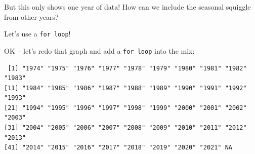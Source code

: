 \documentclass[
]{book}
\newenvironment{Shaded}{\begin{snugshade}}{\end{snugshade}}
\newcommand{\CommentTok}[1]{\textcolor[rgb]{0.56,0.35,0.01}{\textit{#1}}}
\newcommand{\DataTypeTok}[1]{\textcolor[rgb]{0.13,0.29,0.53}{#1}}
\newcommand{\DecValTok}[1]{\textcolor[rgb]{0.00,0.00,0.81}{#1}}
\newcommand{\KeywordTok}[1]{\textcolor[rgb]{0.13,0.29,0.53}{\textbf{#1}}}
\newcommand{\NormalTok}[1]{#1}
\newcommand{\OperatorTok}[1]{\textcolor[rgb]{0.81,0.36,0.00}{\textbf{#1}}}
\newcommand{\StringTok}[1]{\textcolor[rgb]{0.31,0.60,0.02}{#1}}
\begin{document}
But this only shows one year of data! How can we include the seasonal squiggle from other years?

Let's use a \texttt{for\ loop}!

OK -- let's redo that graph and add a \texttt{for\ loop} into the mix:

\begin{Shaded}
\end{Shaded}

\begin{verbatim}
 [1] "1974" "1975" "1976" "1977" "1978" "1979" "1980" "1981" "1982" "1983"
[11] "1984" "1985" "1986" "1987" "1988" "1989" "1990" "1991" "1992" "1993"
[21] "1994" "1995" "1996" "1997" "1998" "1999" "2000" "2001" "2002" "2003"
[31] "2004" "2005" "2006" "2007" "2008" "2009" "2010" "2011" "2012" "2013"
[41] "2014" "2015" "2016" "2017" "2018" "2019" "2020" "2021" NA    
\end{verbatim}
\end{document}

